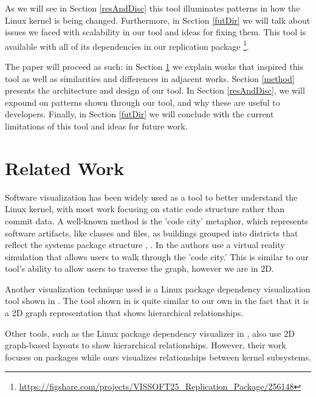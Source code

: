 \documentclass[conference]{IEEEtran}
\begin{document}

As we will see in Section \ref{resAndDisc} this tool illuminates patterns in how the Linux kernel is being changed. Furthermore, in Section \ref{futDir} we will talk about issues we faced with scalability in our tool and ideas for fixing them. This tool is available with all of its dependencies in our replication package \footnote{\url{https://figshare.com/projects/VISSOFT25_Replication_Package/256148}}.

The paper will proceed as such: in Section \ref{relWork} we explain works that inspired this tool as well as similarities and differences in adjacent works. Section \ref{method} presents the architecture and design of our tool. In Section \ref{resAndDisc}, we will expound on patterns shown through our tool, and why these are useful to developers. Finally, in Section \ref{futDir} we will conclude with the current limitations of this tool and ideas for future work.




\section{Related Work}
\label{relWork}


Software visualization has been widely used as a tool to better understand the Linux kernel, with most work focusing on static code structure rather than commit data. A well-known method is the 'code city' metaphor, which represents software artifacts, like classes and files, as buildings grouped into districts that reflect the systems package structure \cite{cityVR}, \cite{city}. In \cite{cityVR} the authors use a virtual reality simulation that allows users to walk through the 'code city.' This is similar to our tool's ability to allow users to traverse the graph, however we are in 2D. 

Another visualization technique used is a Linux package dependency visualization tool shown in \cite{mithun}. The tool shown in \cite{mithun} is quite similar to our own in the fact that it is a 2D graph representation that shows hierarchical relationships.

Other tools, such as the Linux package dependency visualizer in \cite{mithun}, also use 2D graph-based layouts to show hierarchical relationships. However, their work focuses on packages while ours visualizes relationships between kernel subsystems. 
\end{document}
